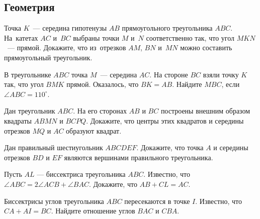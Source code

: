 



\subsection*{Геометрия}

\begin{problems}

\item
Точка $K$~--- середина гипотенузы $AB$ прямоугольного треугольника $ABC$.
На~катетах $AC$ и~$BC$ выбраны точки
$M$ и~$N$ соответственно так, что угол
$MKN$~--- прямой.
Докажите, что из~отрезков $AM$, $BN$ и~$MN$ можно составить прямоугольный
треугольник.

\item
В треугольнике $ABC$ точка $M$~--- середина $AC$. На стороне $BC$ взяли точку $K$ так, что угол $BMK$ прямой. 
Оказалось, что $BK=AB$. Найдите $MBC$, если $\angle ABC =110^{\circ}$.

\item
Дан треугольник $ABC$. На его сторонах $AB$ и $BC$ построены внешним 
образом квадраты $ABMN$ и $BCPQ$. Докажите, что центры этих квадратов и середины отрезков 
$MQ$ и $AC$ образуют квадрат.

\item
Дан правильный шестиугольник $ABCDEF$. Докажите, что точка $A$ и середины отрезков $BD$ и $EF$ являются вершинами правильного треугольника.

\item
Пусть $AL$ --- биссектриса треугольника $ABC$. Известно, что $\angle ABC = 2\angle ACB+\angle BAC$. Докажите, что $AB + CL = AC$.

\item
Биссектрисы углов треугольника $ABC$ пересекаются в точке $I$. Известно, что $CA+AI = BC$. Найдите отношение углов $BAC$ и $CBA$.

\end{problems}

